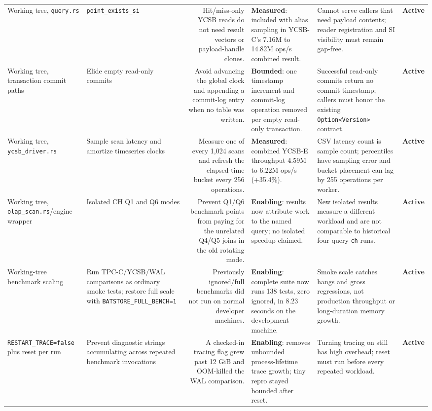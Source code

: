 \documentclass[10pt,a4paper,landscape]{article}
\newcommand{\code}[1]{\texttt{#1}}
\newcommand{\gainmeasured}{\textbf{Measured}}
\newcommand{\gainbounded}{\textbf{Bounded}}
\newcommand{\gainenabling}{\textbf{Enabling}}
\newcommand{\stateactive}{\textbf{Active}}
\begin{document}
\begin{longtable}{IORGKS}
Working tree, \code{query.rs} & \code{point\_exists\_si} & Hit/miss-only YCSB reads do not
need result vectors or payload-handle clones. & \gainmeasured: included with alias sampling
in YCSB-C's 7.16M to 14.82M ops/s combined result. & Cannot serve callers that need payload
contents; reader registration and SI visibility must remain gap-free. & \stateactive \\

Working tree, transaction commit paths & Elide empty read-only commits & Avoid advancing
the global clock and appending a commit-log entry when no table was written. &
\gainbounded: one timestamp increment and commit-log operation removed per empty read-only
transaction. & Successful read-only commits return no commit timestamp; callers must honor
the existing \code{Option<Version>} contract. & \stateactive \\

Working tree, \code{ycsb\_driver.rs} & Sample scan latency and amortize timeseries clocks &
Measure one of every 1,024 scans and refresh the elapsed-time bucket every 256 operations.
& \gainmeasured: combined YCSB-E throughput 4.59M to 6.22M ops/s (+35.4\%). & CSV latency
count is sample count; percentiles have sampling error and bucket placement can lag by 255
operations per worker. & \stateactive \\

Working tree, \code{olap\_scan.rs}/engine wrapper & Isolated CH Q1 and Q6 modes & Prevent
Q1/Q6 benchmark points from paying for the unrelated Q4/Q5 joins in the old rotating mode.
& \gainenabling: results now attribute work to the named query; no isolated speedup claimed.
& New isolated results measure a different workload and are not comparable to historical
four-query \code{ch} runs. & \stateactive \\

Working-tree benchmark scaling & Run TPC-C/YCSB/WAL comparisons as ordinary smoke tests;
restore full scale with \code{BATSTORE\_FULL\_BENCH=1} & Previously ignored/full benchmarks
did not run on normal developer machines. & \gainenabling: complete suite now runs 138 tests,
zero ignored, in 8.23 seconds on the development machine. & Smoke scale catches hangs and
gross regressions, not production throughput or long-duration memory growth. & \stateactive \\

\code{RESTART\_TRACE=false} plus reset per run & Prevent diagnostic strings accumulating
across repeated benchmark invocations & A checked-in tracing flag grew past 12 GiB and
OOM-killed the WAL comparison. & \gainenabling: removes unbounded process-lifetime trace
growth; tiny repro stayed bounded after reset. & Turning tracing on still has high
overhead; reset must run before every repeated workload. & \stateactive \\
\bottomrule
\end{longtable}
\end{document}
